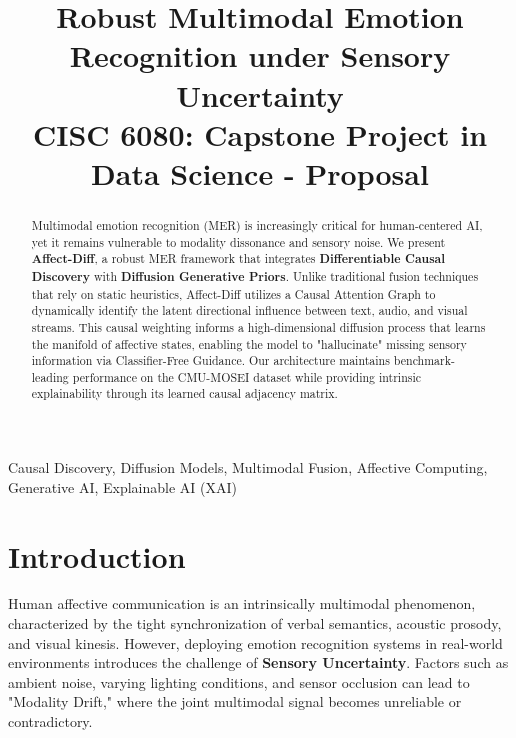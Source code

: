\documentclass[conference]{IEEEtran}
\begin{document}
\title{Robust Multimodal Emotion Recognition under Sensory Uncertainty\\
{\footnotesize CISC 6080: Capstone Project in Data Science - Proposal}
}

\author{
}

\maketitle

\begin{abstract}
Multimodal emotion recognition (MER) is increasingly critical for human-centered AI, yet it remains vulnerable to modality dissonance and sensory noise. We present \textbf{Affect-Diff}, a robust MER framework that integrates \textbf{Differentiable Causal Discovery} with \textbf{Diffusion Generative Priors}. Unlike traditional fusion techniques that rely on static heuristics, Affect-Diff utilizes a Causal Attention Graph to dynamically identify the latent directional influence between text, audio, and visual streams. This causal weighting informs a high-dimensional diffusion process that learns the manifold of affective states, enabling the model to "hallucinate" missing sensory information via Classifier-Free Guidance. Our architecture maintains benchmark-leading performance on the CMU-MOSEI dataset while providing intrinsic explainability through its learned causal adjacency matrix.
\end{abstract}

\begin{IEEEkeywords}
Causal Discovery, Diffusion Models, Multimodal Fusion, Affective Computing, Generative AI, Explainable AI (XAI)
\end{IEEEkeywords}

\section{Introduction}
Human affective communication is an intrinsically multimodal phenomenon, characterized by the tight synchronization of verbal semantics, acoustic prosody, and visual kinesis. However, deploying emotion recognition systems in real-world environments introduces the challenge of \textbf{Sensory Uncertainty}. Factors such as ambient noise, varying lighting conditions, and sensor occlusion can lead to "Modality Drift," where the joint multimodal signal becomes unreliable or contradictory. 
\end{document}
